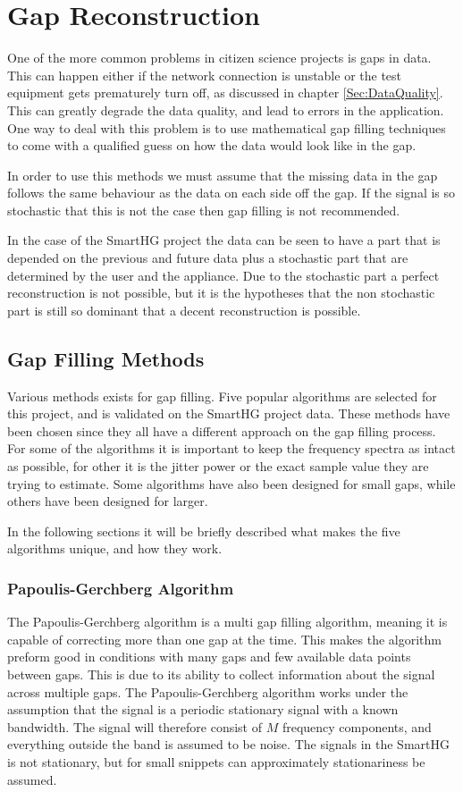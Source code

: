 \chapter{Gap Reconstruction}
One of the more common problems in citizen science projects is gaps in data. This can happen either if the network connection is unstable or the test equipment gets prematurely turn off, as discussed in chapter \ref{Sec:DataQuality}. This can greatly degrade the data quality, and lead to errors in the application. One way to deal with this problem is to use mathematical gap filling techniques to come with a qualified guess on how the data would look like in the gap. 

In order to use this methods we must assume that the missing data in the gap follows the same behaviour as the data on each side off the gap. If the signal is so stochastic that this is not the case then gap filling is not recommended\citep{RefWorks:10}. 

In the case of the SmartHG project the data can be seen to have a part that is depended on the previous and future data plus a stochastic part that are determined by the user and the appliance. Due to the stochastic part a perfect reconstruction is not possible, but it is the hypotheses that the non stochastic part is still so dominant that a decent reconstruction is possible. 

\section{Gap Filling Methods}
\label{T:GapFilling}
Various methods exists for gap filling. Five popular algorithms are selected for this project, and is validated on the SmartHG project data. These methods have been chosen since they all have a different approach on the gap filling process. For some of the algorithms it is important to keep the frequency spectra as intact as possible, for other it is the jitter power or the exact sample value they are trying to estimate. Some algorithms have also been designed for small gaps, while others have been designed for larger. 

In the following sections it will be briefly described what makes the five algorithms unique, and how they work. 

\subsection{Papoulis-Gerchberg Algorithm}
\label{T:PGA}
The Papoulis-Gerchberg algorithm is a multi gap filling algorithm, meaning it is capable of correcting more than one gap at the time. This makes the algorithm preform good in conditions with many gaps and few available data points between gaps. This is due to its ability to collect information about the signal across multiple gaps\citep{RefWorks:11}. The Papoulis-Gerchberg algorithm works under the assumption that the signal is a periodic stationary signal with a known bandwidth. The signal will therefore consist of $M$ frequency components, and everything outside the band is assumed to be noise. The signals in the SmartHG is not stationary, but for small snippets can approximately stationariness be assumed. 

